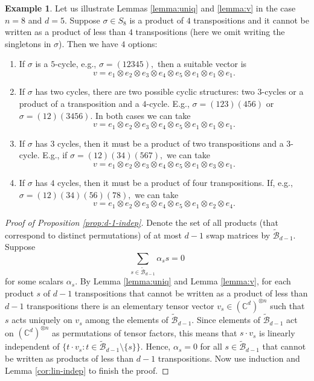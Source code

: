 \documentclass[12pt,dvipsnames,accepted=2016-08-18,a4paper,onecolumn]{quantumarticle}
\numberwithin{equation}{section}
\theoremstyle{definition}
\newtheorem{example}[theorem]{Example}
\begin{document}
\begin{example}
Let us illustrate Lemmas \ref{lemma:uniq} and \ref{lemma:v} in the case $n=8$ and $d=5.$
	Suppose $\sigma \in S_8$ is a product of $4$ transpositions and it cannot be written as a product of less than $4$ transpositions (here we omit writing the singletons in $\sigma$). Then we have $4$ options:
	\begin{enumerate}[\rm (a)]
		\item If $\sigma$ is a $5$-cycle, e.g., $\sigma = (12345),$ then a suitable vector is
		$$
		v = e_1 \otimes e_2 \otimes e_3 \otimes e_4 \otimes e_5 \otimes e_1 \otimes e_1 \otimes e_1.
		$$
		\item If $\sigma$ has two cycles, there are two possible cyclic structures: two $3$-cycles or a product of a transposition and a $4$-cycle. E.g., $\sigma = (123)(456)$ or $\sigma = (12)(3456).$ In both cases we can take
		$$
		v = e_1 \otimes e_2 \otimes e_3 \otimes e_4 \otimes e_5 \otimes e_1 \otimes e_1 \otimes e_1.
		$$
		\item If $\sigma$ has $3$ cycles, then it must be a product of two transpositions and a $3$-cycle. E.g., if $\sigma = (12)(34)(567),$ we can take
		$$
		v = e_1 \otimes e_2 \otimes e_3 \otimes e_4 \otimes e_5 \otimes e_1 \otimes e_3 \otimes e_1.
		$$ 
		\item If $\sigma$ has $4$ cycles, then it must be a product of four transpositions. If, e.g., $\sigma = (12)(34)(56)(78),$ we can take
		$$
		v = e_1 \otimes e_2 \otimes e_3 \otimes e_4 \otimes e_5 \otimes e_1 \otimes e_2 \otimes e_4.
		$$ 
	\end{enumerate}
\end{example}
	
	
	
\begin{proof}[Proof of Proposition \ref{prop:d-1-indep}] 
Denote the set of all products (that correspond to distinct permutations) of at most $d-1$ swap matrices by $\tilde{\mathcal{B}}_{d-1}.$ Suppose
$$\sum_{s\in \tilde{\mathcal{B}}_{d-1}}\alpha_s s=0$$
for some scalars $\alpha_s$. By Lemma \ref{lemma:uniq} and Lemma \ref{lemma:v}, for each product $s$ of $d-1$ transpositions that cannot be written as a product of less than $d-1$ transpositions there is an elementary tensor vector $v_s \in (\mathbb{C}^d)^{\otimes n}$ such that $s$ acts uniquely on $v_s$ among the elements of $\tilde{\mathcal{B}}_{d-1}.$ 
Since elements of $\tilde{\mathcal{B}}_{d-1}$ act on $(\mathbb{C}^d)^{\otimes n}$ as permutations of tensor factors, this means that $s\cdot v_s$ is linearly independent of $\{t\cdot v_s\colon t\in \tilde{\mathcal{B}}_{d-1}\setminus\{s\}\}$.
Hence, $\alpha_s=0$ for all $s\in\tilde{\mathcal{B}}_{d-1}$ that cannot be written as products of less than $d-1$ transpositions. Now use induction and Lemma \ref{cor:lin-indep} to finish the proof.
\end{proof}	
\end{document}
